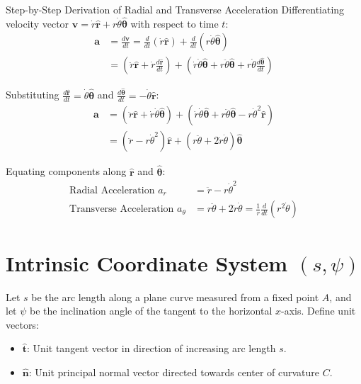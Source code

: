 \begin{proofbox}{Step-by-Step Derivation of Radial and Transverse Acceleration}
Differentiating velocity vector $\mathbf{v} = \dot{r} \hat{\mathbf{r}} + r \dot{\theta} \hat{\boldsymbol{\theta}}$ with respect to time $t$:
\begin{align*}
    \mathbf{a} &= \frac{d\mathbf{v}}{dt} = \frac{d}{dt}(\dot{r} \hat{\mathbf{r}}) + \frac{d}{dt}(r \dot{\theta} \hat{\boldsymbol{\theta}}) \\
    &= \left( \ddot{r} \hat{\mathbf{r}} + \dot{r} \frac{d\hat{\mathbf{r}}}{dt} \right) + \left( \dot{r} \dot{\theta} \hat{\boldsymbol{\theta}} + r \ddot{\theta} \hat{\boldsymbol{\theta}} + r \dot{\theta} \frac{d\hat{\boldsymbol{\theta}}}{dt} \right)
\end{align*}

Substituting $\frac{d\hat{\mathbf{r}}}{dt} = \dot{\theta} \hat{\boldsymbol{\theta}}$ and $\frac{d\hat{\boldsymbol{\theta}}}{dt} = -\dot{\theta} \hat{\mathbf{r}}$:
\begin{align*}
    \mathbf{a} &= (\ddot{r} \hat{\mathbf{r}} + \dot{r} \dot{\theta} \hat{\boldsymbol{\theta}}) + (\dot{r} \dot{\theta} \hat{\boldsymbol{\theta}} + r \ddot{\theta} \hat{\boldsymbol{\theta}} - r \dot{\theta}^2 \hat{\mathbf{r}}) \\
    &= (\ddot{r} - r \dot{\theta}^2) \hat{\mathbf{r}} + (r \ddot{\theta} + 2 \dot{r} \dot{\theta}) \hat{\boldsymbol{\theta}}
\end{align*}

Equating components along $\hat{\mathbf{r}}$ and $\hat{\boldsymbol{\theta}}$:
\begin{align}
    \text{Radial Acceleration } a_r &= \ddot{r} - r \dot{\theta}^2 \\
    \text{Transverse Acceleration } a_\theta &= r \ddot{\theta} + 2 \dot{r} \dot{\theta} = \frac{1}{r} \frac{d}{dt}(r^2 \dot{\theta})
\end{align}
\end{proofbox}

\section{Intrinsic Coordinate System $(s, \psi)$}

Let $s$ be the arc length along a plane curve measured from a fixed point $A$, and let $\psi$ be the inclination angle of the tangent to the horizontal $x$-axis.
Define unit vectors:
\begin{itemize}
    \item $\hat{\mathbf{t}}$: Unit tangent vector in direction of increasing arc length $s$.
    \item $\hat{\mathbf{n}}$: Unit principal normal vector directed towards center of curvature $C$.
\end{itemize}

